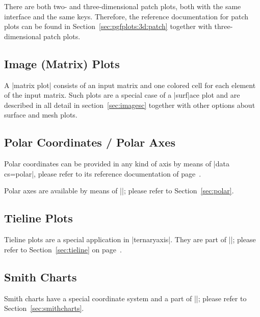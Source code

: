 {There are both two- and three-dimensional patch plots, both with the same
interface and the same keys. Therefore, the reference documentation for patch
plots can be found in Section~\ref{sec:pgfplots:3d:patch} together with
three-dimensional patch plots.


\subsection{Image (Matrix) Plots}

A |matrix plot| consists of an input matrix and one colored cell for each
element of the input matrix. Such plots are a special case of a |surf|ace plot
and are described in all detail in section~\ref{sec:imagesc} together with
other options about surface and mesh plots.


\subsection{Polar Coordinates / Polar Axes}

Polar coordinates can be provided in any kind of axis by means of
|data cs=polar|, please refer to its reference documentation of
page~\pageref{key:data:cs}.

Polar axes are available by means of ||; please refer
to Section~\ref{sec:polar}.


\subsection{Tieline Plots}

Tieline plots are a special application in |ternaryaxis|. They are part of
||; please refer to Section~\ref{sec:tieline} on
page~\pageref{sec:tieline}.


\subsection{Smith Charts}

Smith charts have a special coordinate system and a part of
||; please refer to
Section~\ref{sec:smithcharts}.

}
